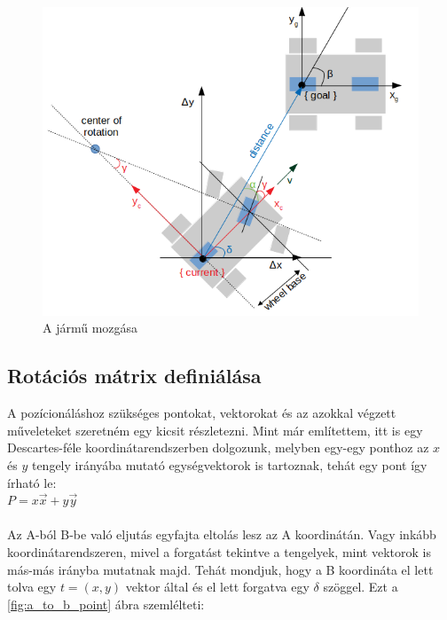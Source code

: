 \begin{figure}[h!]
\centering
\includegraphics[scale=0.70]{images/moving_vehicle.png}
\caption{A jármű mozgása}
\label{fig:moving_vehicle}
\end{figure}

\subsection{Rotációs mátrix definiálása}

A pozícionáláshoz szükséges pontokat, vektorokat és az azokkal végzett műveleteket szeretném egy kicsit részletezni. Mint már említettem, itt is egy Descartes-féle koordinátarendszerben dolgozunk, melyben egy-egy ponthoz az $ x $ és $ y $ tengely irányába mutató egységvektorok is tartoznak, tehát egy pont így írható le:\\

$ P = x\vec{x} + y\vec{y} $\\\\
Az A-ból B-be való eljutás egyfajta eltolás lesz az A koordinátán. Vagy inkább koordinátarendszeren, mivel a forgatást tekintve a tengelyek, mint vektorok is más-más irányba mutatnak majd. Tehát mondjuk, hogy a B koordináta el lett tolva egy $ t = (x, y) $ vektor által és el lett forgatva egy $ \delta $ szöggel. Ezt a \ref{fig:a_to_b_point} ábra szemlélteti:

